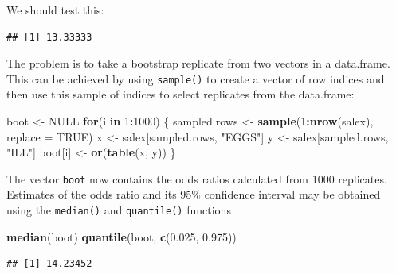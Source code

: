 \documentclass[12pt,a4paper]{book}
\newenvironment{Shaded}{\begin{snugshade}}{\end{snugshade}}
\newcommand{\ControlFlowTok}[1]{\textcolor[rgb]{0.13,0.29,0.53}{\textbf{#1}}}
\newcommand{\DataTypeTok}[1]{\textcolor[rgb]{0.13,0.29,0.53}{#1}}
\newcommand{\DecValTok}[1]{\textcolor[rgb]{0.00,0.00,0.81}{#1}}
\newcommand{\FloatTok}[1]{\textcolor[rgb]{0.00,0.00,0.81}{#1}}
\newcommand{\KeywordTok}[1]{\textcolor[rgb]{0.13,0.29,0.53}{\textbf{#1}}}
\newcommand{\NormalTok}[1]{#1}
\newcommand{\OperatorTok}[1]{\textcolor[rgb]{0.81,0.36,0.00}{\textbf{#1}}}
\newcommand{\OtherTok}[1]{\textcolor[rgb]{0.56,0.35,0.01}{#1}}
\newcommand{\StringTok}[1]{\textcolor[rgb]{0.31,0.60,0.02}{#1}}
\theoremstyle{definition}
\theoremstyle{definition}
\theoremstyle{definition}
\theoremstyle{remark}
\begin{document}
We should test this:

\begin{Shaded}
\end{Shaded}

\begin{verbatim}
## [1] 13.33333
\end{verbatim}

The problem is to take a bootstrap replicate from two vectors in a
data.frame. This can be achieved by using \texttt{sample()} to create a
vector of row indices and then use this sample of indices to select
replicates from the data.frame:

\begin{Shaded}
\begin{Highlighting}[]
\NormalTok{boot <-}\StringTok{ }\OtherTok{NULL}
\ControlFlowTok{for}\NormalTok{(i }\ControlFlowTok{in} \DecValTok{1}\OperatorTok{:}\DecValTok{1000}\NormalTok{) \{}
\NormalTok{  sampled.rows <-}\StringTok{ }\KeywordTok{sample}\NormalTok{(}\DecValTok{1}\OperatorTok{:}\KeywordTok{nrow}\NormalTok{(salex), }\DataTypeTok{replace =} \OtherTok{TRUE}\NormalTok{)}
\NormalTok{  x <-}\StringTok{ }\NormalTok{salex[sampled.rows, }\StringTok{"EGGS"}\NormalTok{]}
\NormalTok{  y <-}\StringTok{ }\NormalTok{salex[sampled.rows, }\StringTok{"ILL"}\NormalTok{]}
\NormalTok{  boot[i] <-}\StringTok{ }\KeywordTok{or}\NormalTok{(}\KeywordTok{table}\NormalTok{(x, y))}
\NormalTok{\}}
\end{Highlighting}
\end{Shaded}

The vector \texttt{boot} now contains the odds ratios calculated from
1000 replicates. Estimates of the odds ratio and its 95\% confidence
interval may be obtained using the \texttt{median()} and
\texttt{quantile()} functions

\begin{Shaded}
\begin{Highlighting}[]
\KeywordTok{median}\NormalTok{(boot)}
\KeywordTok{quantile}\NormalTok{(boot, }\KeywordTok{c}\NormalTok{(}\FloatTok{0.025}\NormalTok{, }\FloatTok{0.975}\NormalTok{))}
\end{Highlighting}
\end{Shaded}

\begin{verbatim}
## [1] 14.23452
\end{verbatim}
\end{document}
